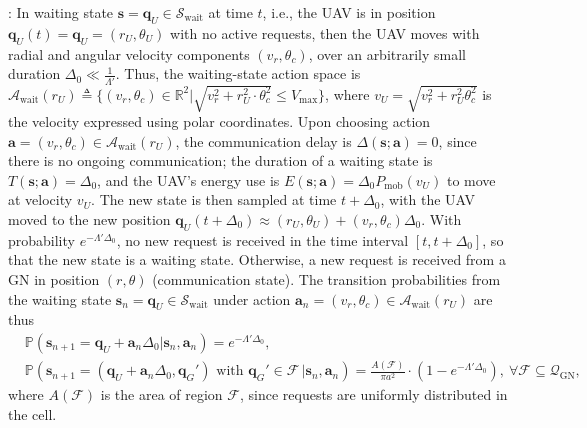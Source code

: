 \documentclass[12pt, draftcls, onecolumn]{IEEEtran}
\theoremstyle{plain}
\theoremstyle{definition}
\theoremstyle{remark}
\begin{document}
: In waiting state $\mathbf{s}{=}\mathbf{q}_{U}{\in}\mathcal{S}_{\mathrm{wait}}$ at time $t$, i.e., the UAV is in position $\mathbf{q}_{U}(t){=}\mathbf{q}_{U}{=}(r_{U},\theta_{U})$ with no active requests, then the UAV moves with radial and angular velocity components $(v_{r},\theta_{c})$, over an arbitrarily small duration $\Delta_{0}{\ll}\frac{1}{\Lambda'}$. Thus, the waiting-state action space is $\mathcal{A}_{\mathrm{wait}}(r_{U}){\triangleq}\Big\{(v_{r},\theta_{c}){\in}\mathbb{R}^{2}\Big|\sqrt{v_{r}^{2}{+}r_{U}^{2}{\cdot}\theta_{c}^{2}}{\leq}V_{\mathrm{max}} \Big\}$, where $v_{U}{=}\sqrt{v_{r}^{2}{+}r_{U}^{2}\theta_{c}^{2}}$ is the velocity expressed using polar coordinates. Upon choosing action $\mathbf{a}{=}(v_{r},\theta_{c}){\in}\mathcal{A}_{\mathrm{wait}}(r_{U})$, the communication delay is $\Delta(\mathbf{s};\mathbf{a}){=}0$, since there is no ongoing communication; the duration of a waiting state is $T(\mathbf{s};\mathbf{a}){=}\Delta_{0}$, and the UAV's energy use is $E(\mathbf{s};\mathbf{a}){=}\Delta_{0}P_{\mathrm{mob}} \left(v_{U}\right)$ to move at velocity $v_{U}$. The new state is then sampled at time $t{+}\Delta_{0}$, with the UAV moved to the new position $\mathbf{q}_{U}(t{+}\Delta_{0}){\approx}(r_{U},\theta_{U}){+}(v_{r},\theta_{c})\Delta_{0}$. With probability $e^{-\Lambda'\Delta_{0}}$, no new request is received in the time interval $[t,t{+}\Delta_{0}]$, so that the new state is a waiting state.  Otherwise, a new request is received from a GN in position $(r,\theta)$ (communication state). The transition probabilities from the waiting state $\mathbf{s}_{n}{=}\mathbf{q}_{U}{\in}\mathcal{S}_\mathrm{wait}$ under action $\mathbf{a}_{n}{=}(v_{r},\theta_{c}){\in}\mathcal{A}_{\mathrm{wait}}(r_{U})$ are thus
\begin{align}\label{eq:CommTransProb}
    &\mathbb{P}(\mathbf{s}_{n+1} = \mathbf q_U + \mathbf a_n\Delta_0 | \mathbf{s}_n,\mathbf{a}_n) = e^{-\Lambda'\Delta_{0}},\\\nonumber
    &\mathbb{P}(\mathbf{s}_{n+1} = (\mathbf q_U + \mathbf a_n\Delta_0,\mathbf q_G') \text{ with } \mathbf q_G' \in \mathcal{F} \,|\mathbf{s}_n,\mathbf{a}_n) = \frac{A(\mathcal{F})}{\pi a^2} \cdot (1 - e^{-\Lambda'\Delta_{0}}),\ \forall \mathcal{F}\subseteq \mathcal{Q}_{\mathrm{GN}},
\end{align}
where $A(\mathcal{F})$ is the area of region $\mathcal{F}$, since requests are uniformly distributed in the cell.
\end{document}
